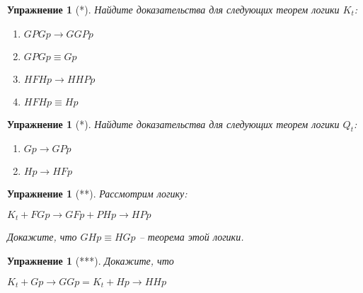 \documentclass[11pt]{article}
\newtheorem{exercise}[theorem]{Упражнение}
\begin{document}
\begin{exercise}[*] Найдите доказательства для следующих теорем логики $K_t$:
\begin{multicols}{3}
\begin{enumerate}
	\item $GPGp \to GGPp$
	\item $GPG p \equiv Gp$
	\item $HFHp \to HHPp$
	\item $HFHp \equiv Hp$
\end{enumerate}
\end{multicols}

\end{exercise}

\begin{exercise}[*] Найдите доказательства для следующих теорем логики $Q_t$:
\begin{multicols}{3}
\begin{enumerate}
	\item $Gp \to GPp$
	\item $Hp \to HFp$
\end{enumerate}
\end{multicols}

\end{exercise}


\begin{exercise}[**] Рассмотрим логику:
\begin{center}
$K_t + FGp \to  GFp + PHp \to  HPp$	
\end{center}
Докажите, что  $GHp \equiv  HGp$ – теорема этой логики.
\end{exercise}

\begin{exercise}[***] Докажите, что 
\begin{center}
$K_t + G p \to GGp  = K_t + Hp \to HH p$	
\end{center}
\end{exercise}
\end{document}
